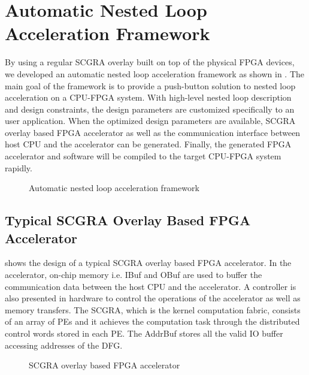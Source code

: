 \section{Automatic Nested Loop Acceleration Framework} \label{sec:acc-framework}
By using a regular SCGRA overlay built on top of the physical FPGA devices, 
we developed an automatic nested loop acceleration framework 
as shown in . The main goal of the  
framework is to provide a push-button solution to 
nested loop acceleration on a CPU-FPGA system. With high-level 
nested loop description and design constraints, the design parameters 
are customized specifically to an user application.  
When the optimized design parameters are available, 
SCGRA overlay based FPGA accelerator as well as the communication 
interface between host CPU and the accelerator can be generated. 
Finally, the generated FPGA accelerator and software will be 
compiled to the target CPU-FPGA system rapidly. 

\begin{figure}[tb]
\caption{Automatic nested loop acceleration framework}
\label{fig:auto-acc-framework}
\end{figure}

\subsection{Typical SCGRA Overlay Based FPGA Accelerator}
 shows the design of a typical SCGRA overlay 
based FPGA accelerator. In the accelerator, on-chip
memory i.e. IBuf and OBuf are used to buffer the communication 
data between the host CPU and 
the accelerator. A controller is also presented in hardware 
to control the operations of the accelerator as well as
memory transfers. The SCGRA, which is the kernel computation fabric,
consists of an array of PEs and it achieves the computation 
task through the distributed control words stored in each PE. The AddrBuf 
stores all the valid IO buffer accessing addresses of the DFG. 

\begin{figure}[tbh]
\caption{SCGRA overlay based FPGA accelerator}
\label{fig:scgra-acc}
\end{figure}

